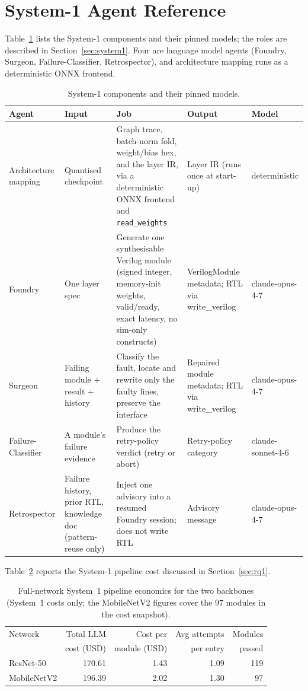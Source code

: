 \section{System-1 Agent Reference}\label{app:agents}

Table~\ref{tab:agents} lists the System-1 components and their pinned models; the roles are described in Section~\ref{sec:system1}. Four are language model agents (Foundry, Surgeon, Failure-Classifier, Retrospector), and architecture mapping runs as a deterministic ONNX frontend.

\begin{table}[t]
\centering
\caption{System-1 components and their pinned models.}
\label{tab:agents}
\footnotesize
\begin{tabular}{@{}>{\raggedright\arraybackslash}p{}p{}p{}p{}p{}@{}}
\toprule
Agent & Input & Job & Output & Model \\
\midrule
Architecture mapping & Quantised checkpoint & Graph trace, batch-norm fold, weight/bias hex, and the layer IR, via a deterministic ONNX frontend and \texttt{read\_weights} & Layer IR (runs once at start-up) & deterministic \\
Foundry & One layer spec & Generate one synthesisable Verilog module (signed integer, memory-init weights, valid/ready, exact latency, no sim-only constructs) & VerilogModule metadata; RTL via write\_verilog & claude-opus-4-7 \\
Surgeon & Failing module + result + history & Classify the fault, locate and rewrite only the faulty lines, preserve the interface & Repaired module metadata; RTL via write\_verilog & claude-opus-4-7 \\
Failure-Classifier & A module's failure evidence & Produce the retry-policy verdict (retry or abort) & Retry-policy category & claude-sonnet-4-6 \\
Retrospector & Failure history, prior RTL, knowledge doc (pattern-reuse only) & Inject one advisory into a resumed Foundry session; does not write RTL & Advisory message & claude-opus-4-7 \\
\bottomrule
\end{tabular}
\end{table}

Table~\ref{tab:rq1cost} reports the System-1 pipeline cost discussed in Section~\ref{sec:rq1}.

\begin{table}[t]
\centering
\caption{Full-network System~1 pipeline economics for the two backbones (System~1 costs only; the MobileNetV2 figures cover the 97 modules in the cost snapshot).}
\label{tab:rq1cost}
\small
\begin{tabular}{@{}lrrrr@{}}
\toprule
Network & Total LLM & Cost per & Avg attempts & Modules \\
        & cost (USD) & module (USD) & per entry & passed \\
\midrule
ResNet-50    & 170.61 & 1.43 & 1.09 & 119 \\
MobileNetV2  & 196.39 & 2.02 & 1.30 & 97 \\
\bottomrule
\end{tabular}
\end{table}

